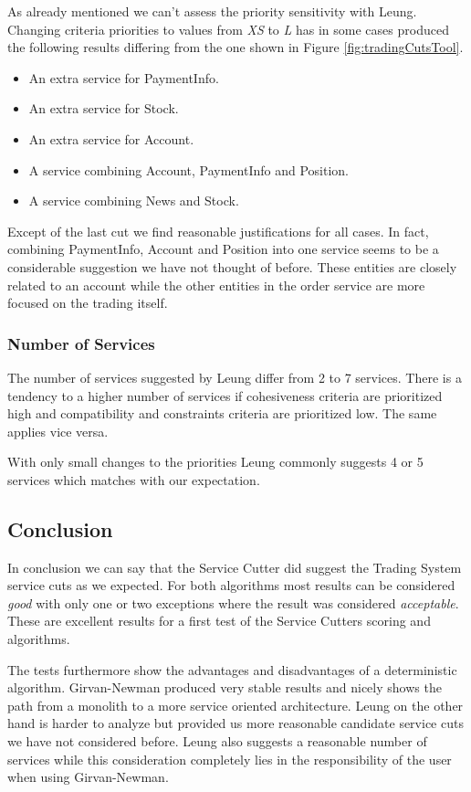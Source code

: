 As already mentioned we can't assess the priority sensitivity with Leung. Changing criteria priorities to values from \textit{XS} to \textit{L} has in some cases produced the following results differing from the one shown in Figure \ref{fig:tradingCutsTool}.

\begin{itemize}
	\item An extra service for PaymentInfo.
	\item An extra service for Stock.
	\item An extra service for Account.
	\item A service combining Account, PaymentInfo and Position.
	\item A service combining News and Stock.
\end{itemize}

Except of the last cut we find reasonable justifications for all cases. In fact, combining PaymentInfo, Account and Position into one service seems to be a considerable suggestion we have not thought of before. These entities are closely related to an account while the other entities in the order service are more focused on the trading itself. 

\subsubsection{Number of Services}

The number of services suggested by Leung differ from 2 to 7 services. There is a tendency to a higher number of services if cohesiveness criteria are prioritized high and compatibility and constraints criteria are prioritized low. The same applies vice versa. 

With only small changes to the priorities Leung commonly suggests 4 or 5 services which matches with our expectation. 

\subsection{Conclusion}

In conclusion we can say that the Service Cutter did suggest the Trading System service cuts as we expected. For both algorithms most results can be considered \textit{good} with only one or two exceptions where the result was considered \textit{acceptable}. These are excellent results for a first test of the Service Cutters scoring and algorithms. 

The tests furthermore show the advantages and disadvantages of a deterministic algorithm. Girvan-Newman produced very stable results and nicely shows the path from a monolith to a more service oriented architecture. Leung on the other hand is harder to analyze but provided us more reasonable candidate service cuts we have not considered before. Leung also suggests a reasonable number of services while this consideration completely lies in the responsibility of the user when using Girvan-Newman.

